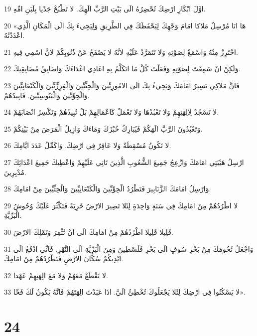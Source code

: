 \par 19 اوَّلَ ابْكَارِ ارْضِكَ تُحْضِرُهُ الَى بَيْتِ الرَّبِّ الَهِكَ. لا تَطْبُخْ جَدْيا بِلَبَنِ امِّهِ.
\par 20 «هَا انَا مُرْسِلٌ مَلاكا امَامَ وَجْهِكَ لِيَحْفَظَكَ فِي الطَّرِيقِ وَلِيَجِيءَ بِكَ الَى الْمَكَانِ الَّذِي اعْدَدْتُهُ.
\par 21 احْتَرِزْ مِنْهُ وَاسْمَعْ لِصَوْتِهِ وَلا تَتَمَرَّدْ عَلَيْهِ لانَّهُ لا يَصْفَحُ عَنْ ذُنُوبِكُمْ لانَّ اسْمِي فِيهِ.
\par 22 وَلَكِنْ انْ سَمِعْتَ لِصَوْتِهِ وَفَعَلْتَ كُلَّ مَا اتَكَلَّمُ بِهِ اعَادِي اعْدَاءَكَ وَاضَايِقُ مُضَايِقِيكَ.
\par 23 فَانَّ مَلاكِي يَسِيرُ امَامَكَ وَيَجِيءُ بِكَ الَى الامُورِيِّينَ وَالْحِثِّيِّينَ وَالْفِرِزِّيِّينَ وَالْكَنْعَانِيِّينَ وَالْحِوِّيِّينَ وَالْيَبُوسِيِّينَ. فَابِيدُهُمْ.
\par 24 لا تَسْجُدْ لِالِهَتِهِمْ وَلا تَعْبُدْهَا وَلا تَعْمَلْ كَاعْمَالِهِمْ بَلْ تُبِيدُهُمْ وَتَكْسِرُ انْصَابَهُمْ.
\par 25 وَتَعْبُدُونَ الرَّبَّ الَهَكُمْ فَيُبَارِكُ خُبْزَكَ وَمَاءَكَ وَازِيلُ الْمَرَضَ مِنْ بَيْنِكُمْ.
\par 26 لا تَكُونُ مُسْقِطَةٌ وَلا عَاقِرٌ فِي ارْضِكَ. وَاكَمِّلُ عَدَدَ ايَّامِكَ.
\par 27 ارْسِلُ هَيْبَتِي امَامَكَ وَازْعِجُ جَمِيعَ الشُّعُوبِ الَّذِينَ تَاتِي عَلَيْهِمْ وَاعْطِيكَ جَمِيعَ اعْدَائِكَ مُدْبِرِينَ.
\par 28 وَارْسِلُ امَامَكَ الزَّنَابِيرَ فَتَطْرُدُ الْحِوِّيِّينَ وَالْكَنْعَانِيِّينَ وَالْحِثِّيِّينَ مِنْ امَامِكَ.
\par 29 لا اطْرُدُهُمْ مِنْ امَامِكَ فِي سَنَةٍ وَاحِدَةٍ لِئَلا تَصِيرَ الارْضُ خَرِبَةً فَتَكْثُرَ عَلَيْكَ وُحُوشُ الْبَرِّيَّةِ.
\par 30 قَلِيلا قَلِيلا اطْرُدُهُمْ مِنْ امَامِكَ الَى انْ تُثْمِرَ وَتَمْلِكَ الارْضَ.
\par 31 وَاجْعَلُ تُخُومَكَ مِنْ بَحْرِ سُوفٍ الَى بَحْرِ فَلَسْطِينَ وَمِنَ الْبَرِّيَّةِ الَى النَّهْرِ. فَانِّي ادْفَعُ الَى ايْدِيكُمْ سُكَّانَ الارْضِ فَتَطْرُدُهُمْ مِنْ امَامِكَ.
\par 32 لا تَقْطَعْ مَعَهُمْ وَلا مَعَ الِهَتِهِمْ عَهْدا.
\par 33 لا يَسْكُنُوا فِي ارْضِكَ لِئَلا يَجْعَلُوكَ تُخْطِئُ الَيَّ. اذَا عَبَدْتَ الِهَتَهُمْ فَانَّهُ يَكُونُ لَكَ فَخّا».

\chapter{24}

